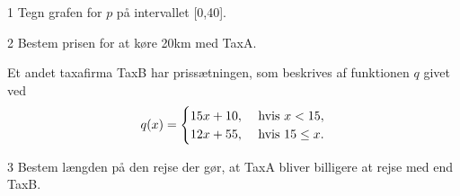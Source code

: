 \documentclass[12pt,x11names,a4paper]{article}
\begin{document}
%
\begin{delopgave}{}{1}
	Tegn grafen for $p$ på intervallet [0,40].
\end{delopgave}
%
\begin{delopgave}{}{2}
	Bestem prisen for at køre 20km med TaxA.
\end{delopgave}
%
\begin{meretekst}
	Et andet taxafirma TaxB har prissætningen, som beskrives af funktionen $q$ givet ved
	\begin{align*}
		q(x) = \begin{cases}
			15x + 10, &\textnormal{ hvis } x < 15, \\
			12x + 55, &\textnormal{ hvis } 15 \leq x.
		\end{cases}
	\end{align*}
\end{meretekst}
%
\begin{delopgave}{}{3}
	Bestem længden på den rejse der gør, at TaxA bliver billigere at rejse med end TaxB.
\end{delopgave}
\end{document}
